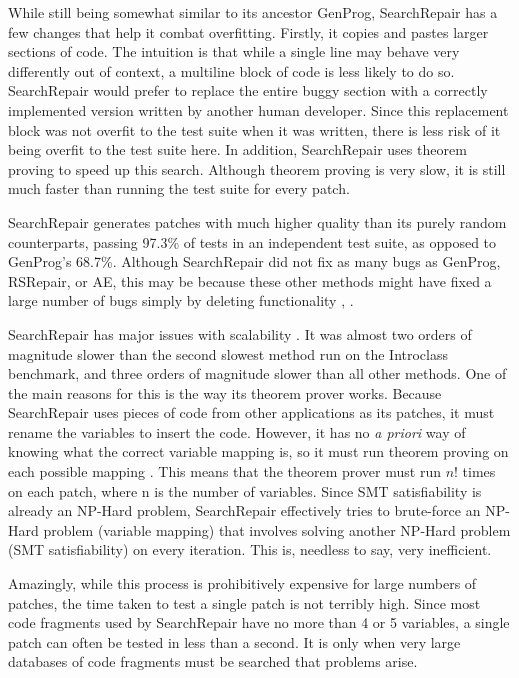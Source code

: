 \documentclass[conference]{IEEEtran}
\begin{document}
While still being somewhat similar to its ancestor GenProg, SearchRepair has a few changes that help it combat overfitting. 
Firstly, it copies and pastes larger sections of code. 
The intuition is that while a single line may behave very differently out of context, a multiline block of code is less likely to do so. 
SearchRepair would prefer to replace the entire buggy section with a correctly implemented version written by another human developer. 
Since this replacement block was not overfit to the test suite when it was written, there is less risk of it being overfit to the test suite here. 
In addition, SearchRepair uses theorem proving to speed up this search. 
Although theorem proving is very slow, it is still much faster than running the test suite for every patch. 

SearchRepair generates patches with much higher quality than its purely random counterparts, passing 97.3\% of tests in an independent test suite, as opposed to GenProg's 68.7\%. 
Although SearchRepair did not fix as many bugs as GenProg, RSRepair, or AE, this may be because these other methods might have fixed a large number of bugs simply by deleting functionality \cite{SearchRepair}, \cite{plausibility}. 


SearchRepair has major issues with scalability \cite{srthesis}. 
It was almost two orders of magnitude slower than the second slowest method run on the Introclass benchmark, and three orders of magnitude slower than all other methods. 
One of the main reasons for this is the way its theorem prover works. 
Because SearchRepair uses pieces of code from other applications as its patches, it must rename the variables to insert the code. 
However, it has no \textit{a priori} way of knowing what the correct variable mapping is, so it must run theorem proving on each possible mapping \cite{srthesis}. 
This means that the theorem prover must run $n!$ times on each patch, where n is the number of variables. 
Since SMT satisfiability is already an NP-Hard problem, SearchRepair effectively tries to brute-force an NP-Hard problem (variable mapping) that involves solving another NP-Hard problem (SMT satisfiability) on every iteration. 
This is, needless to say, very inefficient. 

Amazingly, while this process is prohibitively expensive for large numbers of patches, the time taken to test a single patch is not terribly high. 
Since most code fragments used by SearchRepair have no more than 4 or 5 variables, a single patch can often be tested in less than a second. 
It is only when very large databases of code fragments must be searched that problems arise.
\end{document}
